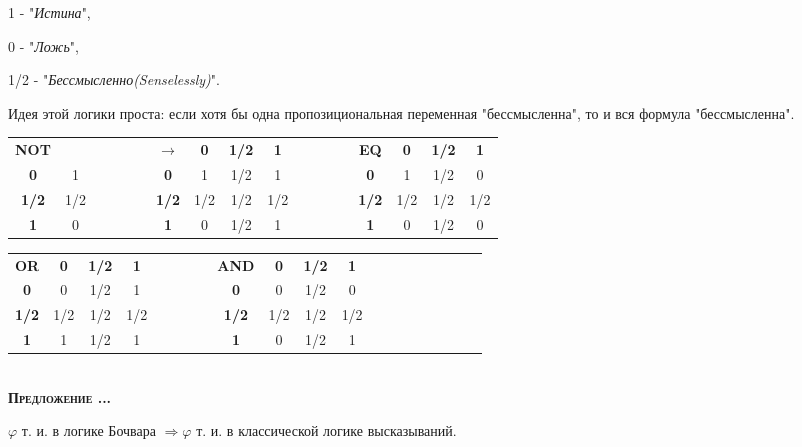 \documentclass[18pt, a4paper]{extarticle}
\newcounter{par}
\newcounter{spar}
\newcounter{zap}
\newcommand{\predl}{\textbf{\textsc{Предложение \thepar.\if\thespar1\thespar.\fi\thezap.\;}}\stepcounter{zap}}
\begin{document}
1 - "\textit{Истина}"{}, 

0 - "\textit{Ложь}"{}, 

1/2 - "\textit{Бессмысленно(Senselessly)}"{}.

Идея этой логики проста: если хотя бы одна пропозициональная переменная "бессмысленна"{}, то и вся формула "бессмысленна"{}.

\begin{center}
\begin{tabular}{|c|c|llll|c|c|c|c|llll|c|c|c|c|}
\cline{1-2} \cline{7-10} \cline{15-18}
\textbf{NOT} & & & & & & \textbf{$\rightarrow$} & \textbf{0} & \textbf{1/2} & \textbf{1} & & & & & \textbf{EQ} & \textbf{0} & \textbf{1/2} & \textbf{1} \\
\cline{1-2} \cline{7-10} \cline{15-18}
\textbf{0} & 1 & & & & & \textbf{0} & 1 & 1/2 & 1 & & & & & \textbf{0} & 1 & 1/2 & 0 \\
\cline{1-2} \cline{7-10} \cline{15-18}
\textbf{1/2} & 1/2 & & & & & \textbf{1/2} & 1/2 & 1/2 & 1/2 & & & & & \textbf{1/2} & 1/2 & 1/2 & 1/2 \\
\cline{1-2} \cline{7-10} \cline{15-18}
\textbf{1} & 0 & & & & & \textbf{1} & 0 & 1/2 & 1  & & & & & \textbf{1} & 0 & 1/2 & 0 \\
\cline{1-2} \cline{7-10} \cline{15-18}
\end{tabular}
\end{center}

\begin{center}
\begin{tabular}{|c|c|c|c|llll|c|c|c|c|llll|c|c|c|c|}
\cline{1-4} \cline{9-12}
\textbf{OR} & \textbf{0} & \textbf{1/2} & \textbf{1} & & & & & \textbf{AND} & \textbf{0} & \textbf{1/2} & \textbf{1} \\
\cline{1-4} \cline{9-12}
\textbf{0} & 0 & 1/2 & 1 & & & & & \textbf{0} & 0 & 1/2 & 0 \\ 
\cline{1-4} \cline{9-12}
\textbf{1/2} & 1/2 & 1/2 & 1/2 & & & & & \textbf{1/2} & 1/2 & 1/2 & 1/2 \\ 
\cline{1-4} \cline{9-12}
\textbf{1} & 1 & 1/2 & 1 & & & & & \textbf{1} & 0 & 1/2 & 1 \\ 
\cline{1-4} \cline{9-12}
\end{tabular}
\end{center}\\

\predl

$\varphi$ т. и. в логике Бочвара $\Rightarrow \varphi$ т. и. в классической логике высказываний.\\
\end{document}
